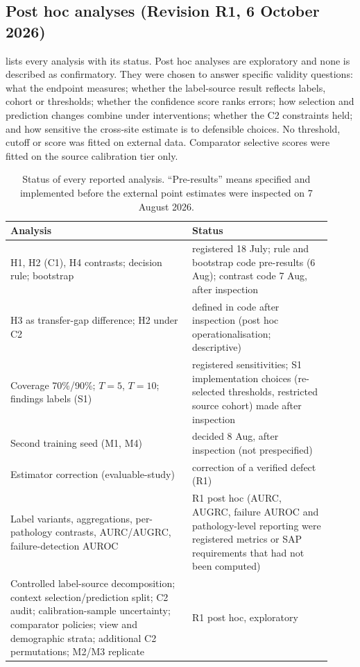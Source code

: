 \subsection{Post hoc analyses (Revision R1, 6 October 2026)}
 lists every analysis with its status. Post hoc analyses are
exploratory and none is described as confirmatory. They were chosen to
answer specific validity questions: what the endpoint measures; whether the
label-source result reflects labels, cohort or thresholds; whether the
confidence score ranks errors; how selection and prediction changes combine
under interventions; whether the C2 constraints held; and how sensitive the
cross-site estimate is to defensible choices. No threshold, cutoff or score was
fitted on external data. Comparator selective scores were fitted on the source
calibration tier only.

\begin{table}[t]
\centering\small
\caption{Status of every reported analysis. ``Pre-results'' means specified and
implemented before the external point estimates were inspected on 7 August 2026.}
\label{tab:status}
\begin{tabular}{p{0.52\linewidth}p{0.4\linewidth}}
\toprule
Analysis & Status\\
\midrule
H1, H2 (C1), H4 contrasts; decision rule; bootstrap & registered 18 July; rule and bootstrap code pre-results (6 Aug); contrast code 7 Aug, after inspection\\
H3 as transfer-gap difference; H2 under C2 & defined in code after inspection (post hoc operationalisation; descriptive)\\
Coverage 70\%/90\%; $T=5$, $T=10$; findings labels (S1) & registered sensitivities; S1 implementation choices (re-selected thresholds, restricted source cohort) made after inspection\\
Second training seed (M1, M4) & decided 8 Aug, after inspection (not prespecified)\\
Estimator correction (evaluable-study) & correction of a verified defect (R1)\\
Label variants, aggregations, per-pathology contrasts, AURC/AUGRC, failure-detection AUROC & R1 post hoc (AURC, AUGRC, failure AUROC and pathology-level reporting were registered metrics or SAP requirements that had not been computed)\\
Controlled label-source decomposition; context selection/prediction split; C2 audit; calibration-sample uncertainty; comparator policies; view and demographic strata; additional C2 permutations; M2/M3 replicate & R1 post hoc, exploratory\\
\bottomrule
\end{tabular}
\end{table}
